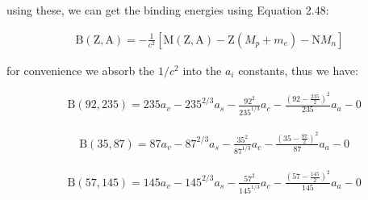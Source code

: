 \documentclass[11pt]{article}
\theoremstyle{definition}
\begin{document}



using these, we can get the binding energies using Equation 2.48:

\begin{align*}
    \text{B}(\text{Z},\text{A}) = -\frac{1}{c^2}[\text{M}(\text{Z},\text{A}) - \text{Z}(M_p+m_e) - \text{N}M_n] \tag{2.48}
\end{align*}

for convenience we absorb the $1/c^2$ into the $a_i$ constants, thus we have:

\begin{align*}
    &\text{B}(92,235) = 235a_v - 235^{2/3}a_s - \frac{92^2}{235^{1/3}}a_c - \frac{(92-\frac{235}{2})^2}{235}a_a - 0 \tag{2.57.1}
\end{align*}

\begin{align*}
    &\text{B}(35,87) = 87a_v - 87^{2/3}a_s - \frac{35^2}{87^{1/3}}a_c - \frac{(35-\frac{87}{2})^2}{87}a_a - 0 \tag{2.57.2}
\end{align*}

\begin{align*}
    &\text{B}(57,145) = 145a_v - 145^{2/3}a_s - \frac{57^2}{145^{1/3}}a_c - \frac{(57-\frac{145}{2})^2}{145}a_a - 0 \tag{2.57.3}
\end{align*}

\end{document}
